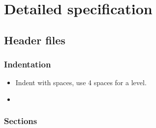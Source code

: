 \documentclass[a4paper,twoside,15pt]{book}
\begin{document}
\chapter{Detailed specification}
    \section{Header files}
        \subsection{Indentation}
            \begin{itemize}
                \item Indent with spaces, use 4 spaces for a level.
                \item 
            \end{itemize}

        \subsection{Sections}
\end{document}
